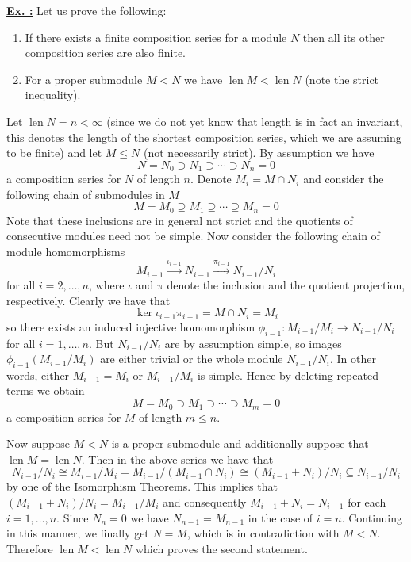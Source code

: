 \documentclass[a4paper, 12pt]{article}
\DeclareMathOperator{\len}{len}
\newcommand{\iso}{\cong}
\newcounter{excounter}[section]
\newenvironment{Exercise}
    {\refstepcounter{excounter}\underline{\textbf{Ex. \theexcounter:}}}
    {\par\vspace{\baselineskip}}
\begin{document}
\begin{Exercise}
    Let us prove the following:
    \begin{enumerate}
        \item If there exists a finite composition series for a module $N$ then all its other composition series are also finite.
        \item For a proper submodule $M < N$ we have $\len M < \len N$ (note the strict inequality).
    \end{enumerate}
    
    Let $\len N = n < \infty$ (since we do not yet know that length is in fact an invariant, this denotes the length of the shortest composition series, which we are assuming to be finite) and let $M \leq N$ (not necessarily strict).
    By assumption we have
    \[
        N = N_0 \supset N_1 \supset \cdots \supset N_n = 0
    \]
    a composition series for $N$ of length $n$.
    Denote $M_i = M \cap N_i$ and consider the following chain of submodules in $M$
    \[
        M = M_0 \supseteq M_1 \supseteq \cdots \supseteq M_n = 0
    \]
    Note that these inclusions are in general not strict and the quotients of consecutive modules need not be simple.
    Now consider the following chain of module homomorphisms
    \[
        M_{i-1} \xrightarrow{\iota_{i-1}} N_{i-1} \xrightarrow{\pi_{i-1}} N_{i-1}/N_i
    \]
    for all $i = 2,\dots, n$, where $\iota$ and $\pi$ denote the inclusion and the quotient projection, respectively.
    Clearly we have that
    \[
        \ker\iota_{i-1}\pi_{i-1} = M \cap N_i = M_i
    \]
    so there exists an induced injective homomorphism $\phi_{i-1} \colon M_{i-1}/M_i \to N_{i-1}/N_i$ for all $i = 1,\dots,n$.
    But $N_{i-1}/N_i$ are by assumption simple, so images $\phi_{i-1}(M_{i-1}/M_i)$ are either trivial or the whole module $N_{i-1}/N_i$.
    In other words, either $M_{i-1} = M_i$ or $M_{i-1}/M_i$ is simple.
    Hence by deleting repeated terms we obtain
    \[
        M = M_0 \supset M_1 \supset \cdots \supset M_m = 0
    \]
    a composition series for $M$ of length $m \leq n$.

    Now suppose $M < N$ is a proper submodule and additionally suppose that $\len M = \len N$.
    Then in the above series we have that
    \[
        N_{i-1}/N_i \iso M_{i-1}/M_i = M_{i-1}/(M_{i-1}\cap N_i) \iso (M_{i-1} + N_i)/N_i \subseteq N_{i-1}/N_i
    \]
    by one of the Isomorphism Theorems.
    This implies that $(M_{i-1} + N_i)/N_i = M_{i-1}/M_i$ and consequently $M_{i-1} + N_i = N_{i-1}$ for each $i = 1, \dots, n$.
    Since $N_n = 0$ we have $N_{n-1} = M_{n-1}$ in the case of $i = n$.
    Continuing in this manner, we finally get $N = M$, which is in contradiction with $M < N$.
    Therefore $\len M < \len N$ which proves the second statement.


\end{Exercise}
\end{document}
